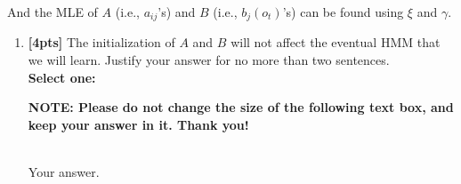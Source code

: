 \begin{enumerate}
    And the MLE of $A$ (i.e., $a_{ij}$'s) and $B$ (i.e., $b_j(o_t)$'s) can be found using $\xi$ and $\gamma$. 
    
    
   \begin{enumerate}
         \item \textbf{[4pts]} The initialization of $A$ and $B$ will not affect the eventual HMM that we will learn. Justify your answer for no more than two sentences.\\
        \textbf{Select one:}
        \textbf{NOTE: Please do not change the size of the following text box, and keep your answer in it. Thank you!} \\ \\
        \begin{tcolorbox}[fit,height=4cm, width=15cm, blank, borderline={1pt}{-2pt},nobeforeafter]
        \large
        Your answer.
    

\end{tcolorbox}
\end{enumerate}
\end{enumerate}
